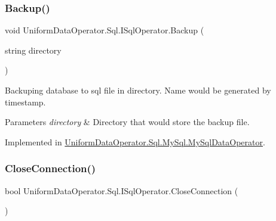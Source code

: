 \mbox{\label{interface_uniform_data_operator_1_1_sql_1_1_i_sql_operator_a096be4f746c1fcbb8b2894c2517b937c}} 
\subsubsection{\texorpdfstring{Backup()}{Backup()}}
{\footnotesize\ttfamily void Uniform\+Data\+Operator.\+Sql.\+I\+Sql\+Operator.\+Backup (\begin{DoxyParamCaption}\item[{string}]{directory }\end{DoxyParamCaption})}



Backuping database to sql file in directory. Name would be generated by timestamp. 


\begin{DoxyParams}{Parameters}
{\em directory} & Directory that would store the backup file.\\
\hline
\end{DoxyParams}


Implemented in \mbox{\hyperlink{class_uniform_data_operator_1_1_sql_1_1_my_sql_1_1_my_sql_data_operator_a0dbd58206733a17dd26143b58d0859d7}{Uniform\+Data\+Operator.\+Sql.\+My\+Sql.\+My\+Sql\+Data\+Operator}}.

\mbox{\label{interface_uniform_data_operator_1_1_sql_1_1_i_sql_operator_a1a6429996e1bbb452f4e034fd634e640}} 
\subsubsection{\texorpdfstring{Close\+Connection()}{CloseConnection()}}
{\footnotesize\ttfamily bool Uniform\+Data\+Operator.\+Sql.\+I\+Sql\+Operator.\+Close\+Connection (\begin{DoxyParamCaption}{ }\end{DoxyParamCaption})}



